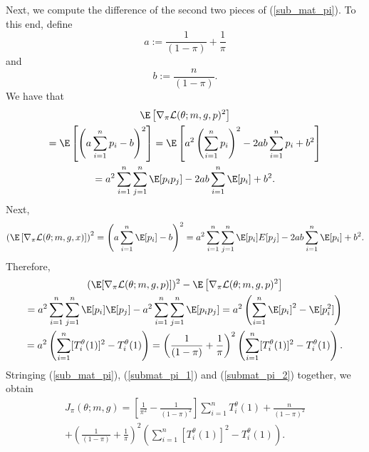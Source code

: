 \documentclass[11pt]{article}
\begin{document}
\begin{appendices}
\begin{refsection}
Next, we compute the difference of the second two pieces of (\ref{sub_mat_pi}). To this end, define $$a := \frac{1}{(1-\pi)} + \frac{1}{\pi}$$ and $$b := \frac{n}{(1-\pi)}.$$ We have that
\begin{multline*}
\E \left[\nabla_\pi \mathcal{L}(\theta; m, g, p)^2 \right] \\ = \E \left[ \left( a \sum_{i=1}^n p_i - b\right)^2 \right]  =  \E \left[ a^2 \left( \sum_{i=1}^n p_i \right)^2 - 2ab \sum_{i=1}^n p_i + b^2 \right] \\ = a^2 \sum_{i=1}^n \sum_{j=1}^n \E[p_i p_j] -2ab \sum_{i=1}^n \E [p_i] + b^2.
\end{multline*}
Next,
\begin{equation*}
\left( \E \left[\nabla_\pi \mathcal{L}(\theta; m, g, x) \right] \right)^2 = \left( a \sum_{i=1}^n \E [p_i] - b \right)^2 = a^2 \sum_{i=1}^n \sum_{j=1}^n \E[p_i]  E[p_j] - 2ab \sum_{i=1}^n \E[p_i] + b^2.
\end{equation*}
Therefore,
\begin{multline}\label{submat_pi_2}
(\E [\nabla_\pi \mathcal{L}(\theta; m, g, p)])^2 - \E \left[\nabla_\pi \mathcal{L}(\theta; m, g, p)^2 \right] \\ = a^2 \sum_{i=1}^n \sum_{j=1}^n \E[p_i] \E[p_j] - a^2 \sum_{i=1}^n \sum_{j=1}^n \E[p_i p_j] = a^2 \left( \sum_{i=1}^n \E[p_i]^2 - \E[p_i^2]\right) \\ = a^2 \left( \sum_{i=1}^n [T^\theta_i(1)]^2 - T^\theta_i(1) \right) = \left( \frac{1}{(1 - \pi)} + \frac{1}{\pi} \right)^2 \left(\sum_{i=1}^n [T^\theta_i(1)]^2 - T^\theta_i(1) \right).
\end{multline}
Stringing (\ref{sub_mat_pi}), (\ref{submat_pi_1}) and (\ref{submat_pi_2}) together, we obtain
\begin{multline}\label{sub_mat_1_formula}
J_\pi(\theta; m, g) = 
\left[ \frac{1}{\pi^2} - \frac{1}{(1 - \pi )^2} \right] \sum_{i=1}^n T^\theta_i(1) + \frac{n}{(1-\pi )^2} \\ + \left( \frac{1}{(1 - \pi )} + \frac{1}{\pi} \right)^2 \left( \sum_{i=1}^n [T^\theta_i(1)]^2 - T^\theta_i(1) \right).
\end{multline}


\end{refsection}
\end{appendices}
\end{document}
